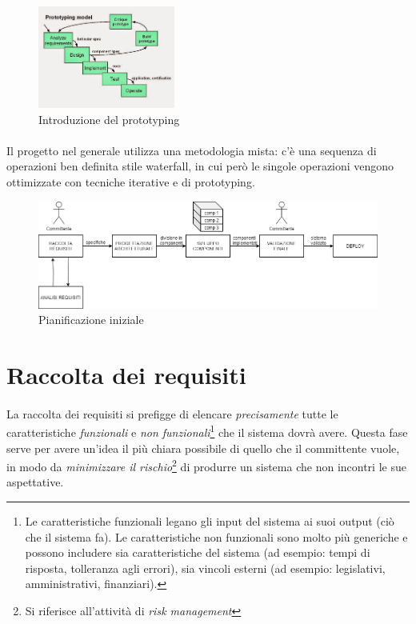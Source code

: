 \documentclass[11pt,a4paper,english]{article}
\begin{document}
\begin{figure}[H]
    \centering
    \includegraphics[width=0.4\textwidth]{img/prototyping.jpg}
    \caption{Introduzione del prototyping}
\end{figure}

\paragraph{} Il progetto nel generale utilizza una metodologia mista: c'è una sequenza di operazioni ben definita stile waterfall, in cui però le singole operazioni vengono ottimizzate con tecniche iterative e di prototyping. 

\begin{figure}[H]
    \centering
    \includegraphics[width=1\textwidth]{img/pianificazione iniziale.png}
    \caption{Pianificazione iniziale}
\end{figure}

\newpage
\section{Raccolta dei requisiti}

\paragraph{} La raccolta dei requisiti \cite{req_analysis} si prefigge di elencare \emph{precisamente} tutte le caratteristiche \emph {funzionali} e \emph{non funzionali}\footnote{Le caratteristiche funzionali legano gli input del sistema ai suoi output (ciò che il sistema fa). Le caratteristiche non funzionali sono molto più generiche e possono includere sia caratteristiche del sistema (ad esempio: tempi di risposta, tolleranza agli errori), sia vincoli esterni (ad esempio: legislativi, amministrativi, finanziari).} che il sistema dovrà avere. Questa fase serve per avere un'idea il più chiara possibile di quello che il committente vuole, in modo da \emph{minimizzare il rischio}\footnote{Si riferisce all'attività di \emph{risk management}} di produrre un sistema che non incontri le sue aspettative.
\end{document}
